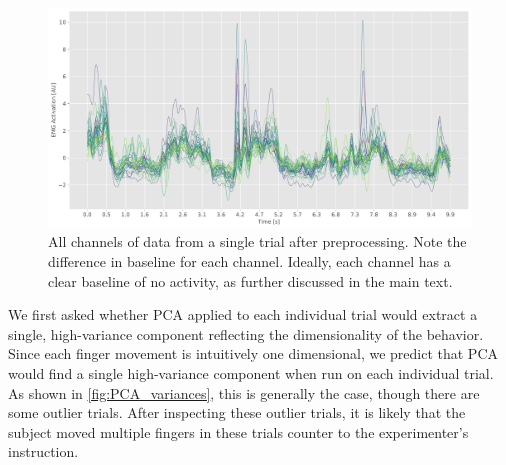 \documentclass[
  a4paper,
]{article}
\begin{document}
\begin{figure}
\hypertarget{fig:preprocessed_data}{%
\centering
\includegraphics[width=1\textwidth,height=\textheight]{images/data_analysis/fingers/preprocessed_data.pdf}
\caption{All channels of data from a single trial after preprocessing.
Note the difference in baseline for each channel. Ideally, each channel
has a clear baseline of no activity, as further discussed in the main
text.}\label{fig:preprocessed_data}
}
\end{figure}

We first asked whether PCA applied to each individual trial would
extract a single, high-variance component reflecting the dimensionality
of the behavior. Since each finger movement is intuitively one
dimensional, we predict that PCA would find a single high-variance
component when run on each individual trial. As shown in
\cref{fig:PCA_variances}, this is generally the case, though there are
some outlier trials. After inspecting these outlier trials, it is likely
that the subject moved multiple fingers in these trials counter to the
experimenter's instruction.
\end{document}
